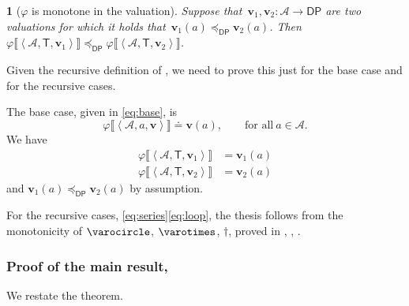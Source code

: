 \documentclass[twocolumn,english]{IEEEconf}
\theoremstyle{plain}
\theoremstyle{definition}
\theoremstyle{definition}
\theoremstyle{plain}
\newtheorem{lem}[thm]{\protect\lemmaname}
\newcommand{\aword}[1]{\mathsf{#1}}
\newcommand{\vmath}[1]{\aword{#1}}
\newcommand{\posleq}{\preceq}
\newcommand{\dpsp}{\vmath{DP}}
\newcommand{\dpleq}{\posleq_\dpsp}
\newcommand{\dpsem}{\varphi}
\newcommand{\atoms}{\mathcal{A}}
\newcommand{\atree}{\boldsymbol{\vmath{T}}}
\newcommand{\val}{\boldsymbol{v}}
\newcommand{\oploop}{\dagger}
\newcommand{\opseries}{\mathbin{\varocircle}}
\newcommand{\oppar}{\mathbin{\varotimes}}
\providecommand{\lemmaname}{Lemma}
\begin{document}
\begin{lem}[$\dpsem$ is monotone in the valuation]
\label{lem:dpsem-monotone}Suppose that~$\val_{1},\val_{2}:\atoms\rightarrow\dpsp$
are two valuations for which it holds that~$\val_{1}(a)\dpleq\val_{2}(a)$.
Then~$\dpsem\llbracket\left\langle \atoms,\atree,\val_{1}\right\rangle \rrbracket\dpleq\dpsem\llbracket\left\langle \atoms,\atree,\val_{2}\right\rangle \rrbracket$.
\end{lem}
\begin{IEEEproof}
Given the recursive definition of , we need
to prove this just for the base case and for the recursive cases.

The base case, given in \eqref{eq:base}, is
\[
\dpsem\llbracket\left\langle \atoms,a,\val\right\rangle \rrbracket\doteq\val(a),\qquad\text{for all}\ a\in\atoms.
\]
We have
\begin{align*}
\dpsem\llbracket\left\langle \atoms,\atree,\val_{1}\right\rangle \rrbracket & =\val_{1}(a)\\
\dpsem\llbracket\left\langle \atoms,\atree,\val_{2}\right\rangle \rrbracket & =\val_{2}(a)
\end{align*}
and $\val_{1}(a)\dpleq\val_{2}(a)$ by assumption.

For the recursive cases, \eqref{eq:series}\textendash \eqref{eq:loop},
the thesis follows from the monotonicity of $\opseries$, $\oppar$,
$\oploop$, proved in , ,
.
\end{IEEEproof}

\subsubsection{Proof of the main result, }

\label{subsec:proof-main-result}

We restate the theorem.
\end{document}
